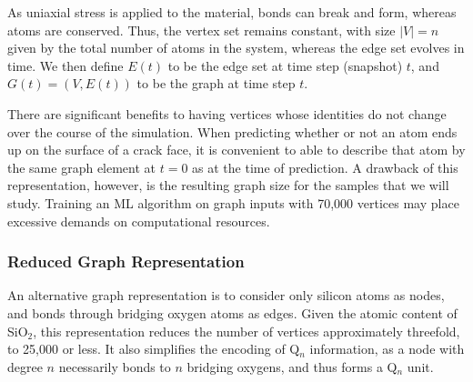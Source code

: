 As uniaxial stress is applied to the material, bonds can break and form, whereas atoms are conserved.  Thus, the vertex set remains constant, with size $|V|=n$ given by the total number of atoms in the system, whereas the edge set evolves in time.  We then define $E(t)$ to be the edge set at time step (snapshot) $t$, and $G(t) = (V,E(t))$ to be the graph at time step $t$.

There are significant benefits to having vertices whose identities do not change over the course of the simulation.  When predicting whether or not an atom ends up on the surface of a crack face, it is convenient to able to describe that atom by the same graph element at $t=0$ as at the time of prediction.  A drawback of this representation, however, is the resulting graph size for the samples that we will study.  Training an ML algorithm on graph inputs with 70,000 vertices may place excessive demands on computational resources.


    
\subsubsection{Reduced Graph Representation} 

An alternative graph representation is to consider only silicon atoms as nodes, and bonds through bridging oxygen atoms as edges.  Given the atomic content of SiO$_2$, this representation reduces the number of vertices approximately threefold, to 25,000 or less.  It also simplifies the encoding of Q$_n$ information, as a node with degree $n$ necessarily bonds to $n$ bridging oxygens, and thus forms a Q$_n$ unit.

